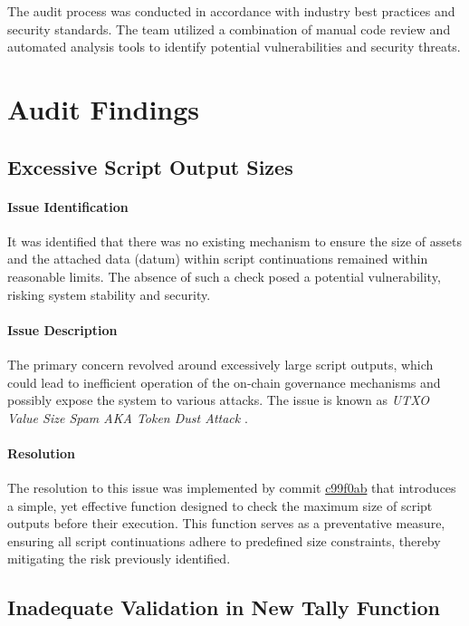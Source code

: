 \documentclass[11pt]{article}
\begin{document}
The audit process was conducted in accordance with industry best practices and security standards.
The team utilized a combination of manual code review and automated analysis tools to identify potential vulnerabilities and security threats.

\section{Audit Findings}

\subsection{Excessive Script Output Sizes}

\paragraph{Issue Identification}
It was identified that there was no existing mechanism to ensure the size of assets and the attached data (datum) within script continuations remained within reasonable limits. The absence of such a check posed a potential vulnerability, risking system stability and security.

\paragraph{Issue Description}
The primary concern revolved around excessively large script outputs, which could lead to inefficient operation of the on-chain governance mechanisms and possibly expose the system to various attacks. The issue is known as \textit{UTXO Value Size Spam AKA Token Dust Attack} \cite{CommonVuls}.

\paragraph{Resolution}
The resolution to this issue was implemented by commit \href{https://github.com/MuesliSwapTeam/muesliswap-atala-onchain-governance/commit/c99f0ab3f2e5a68499d4f137a53670ddee71510b}{c99f0ab} that introduces a simple, yet effective function designed to check the maximum size of script outputs before their execution. This function serves as a preventative measure, ensuring all script continuations adhere to predefined size constraints, thereby mitigating the risk previously identified.


\subsection{Inadequate Validation in New Tally Function}
\end{document}
